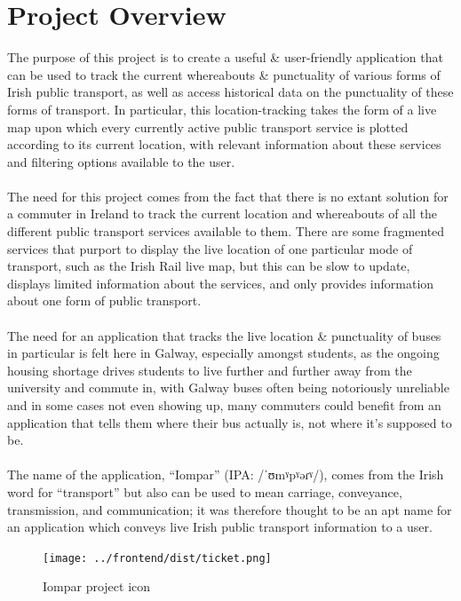 \documentclass[a4paper,11pt]{report}
\begin{document}
\section{Project Overview}
The purpose of this project is to create a useful \& user-friendly application that can be used to track the current whereabouts \& punctuality of various forms of Irish public transport, as well as access historical data on the punctuality of these forms of transport.
In particular, this location-tracking takes the form of a live map upon which every currently active public transport service is plotted according to its current location, with relevant information about these services and filtering options available to the user.
\\\\
The need for this project comes from the fact that there is no extant solution for a commuter in Ireland to track the current location and whereabouts of all the different public transport services available to them.
There are some fragmented services that purport to display the live location of one particular mode of transport, such as the Irish Rail live map\supercite{liveir}, but this can be slow to update, displays limited information about the services, and only provides information about one form of public transport.
\\\\
The need for an application that tracks the live location \& punctuality of buses in particular is felt here in Galway, especially amongst students, as the ongoing housing shortage drives students to live further and further away from the university and commute in, with Galway buses often being notoriously unreliable and in some cases not even showing up, many commuters could benefit from an application that tells them where their bus actually is, not where it's supposed to be.
\\\\
The name of the application, ``Iompar'' (IPA: /ˈʊmˠpˠəɾˠ/), comes from the Irish word for ``transport'' but also can be used to mean carriage, conveyance, transmission, and communication\supercite{iompar_teanglann};
it was therefore thought to be an apt name for an application which conveys live Irish public transport information to a user.

\begin{figure}[H]
    \centering
    \texttt{[image: ../frontend/dist/ticket.png]}
    \caption{Iompar project icon\supercite{trainticket}}
\end{figure}
\end{document}
